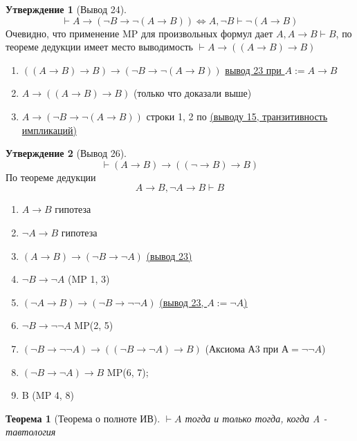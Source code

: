 \documentclass[a4paper]{article}
\newtheorem{theorem}{Теорема}[section]
\theoremstyle{definition}
\newtheorem*{statement}{Утверждение}
\theoremstyle{remark}
\begin{document}
    \begin{statement}[\hypertarget{Вывод 24}{Вывод 24}] 
        $$\vdash A\to (\neg B \to \neg (A\to B)) \Leftrightarrow A, \neg B \vdash \neg (A \to B)$$
        Очевидно, что применение MP для произвольных формул дает $A, A → B \vdash B$, по теореме дедукции имеет место выводимость
        $\vdash A → ((A → B) → B)$
        \begin{enumerate}
            \item $((A\to B)\to B)\to (\neg B \to \neg (A\to B))$  \hyperlink{Вывод 23}{вывод 23 при $A:= A\to B$}
            \item $A\to ((A\to B) \to B)$ (только что доказали выше)
            \item $A\to (\neg B \to \neg (A\to B))$ строки 1, 2 по \hyperlink{Вывод 15}{(выводу 15, транзитивность импликаций)}
        \end{enumerate}
    \end{statement}
    \begin{statement}[Вывод 26]
        $$\vdash (A\to B)\to ((\neg \to B) \to B)$$
        По теореме дедукции
        $$A\to B, \neg A \to B \vdash B$$
        \begin{enumerate}
            \item $A\to B$ гипотеза
            \item $\neg A\to B$ гипотеза
            \item $(A\to B) \to (\neg B \to \neg A)$ \hyperlink{Вывод 23}{(вывод 23)}
            \item $\neg B \to \neg A$ (MP 1, 3)
            \item $(\neg A \to B)\to (\neg B \to \neg \neg A)$ \hyperlink{Вывод 23}{(вывод 23, $A := \neg A$)}
            \item $\neg B \to \neg \neg A$ MP(2, 5)
            \item $(\neg B \to \neg\neg A) \to ((\neg B \to \neg A) \to B)$ (Аксиома А3 при $А = \neg \neg A$)
            \item $(\neg B \to \neg A) \to B$ MP(6, 7);
            \item B (MP 4, 8)
        \end{enumerate}
    \end{statement}
	\begin{theorem}[Теорема о полноте ИВ]
		$\vdash A$ тогда и только тогда, когда A - тавтология
	\end{theorem}
\end{document}
